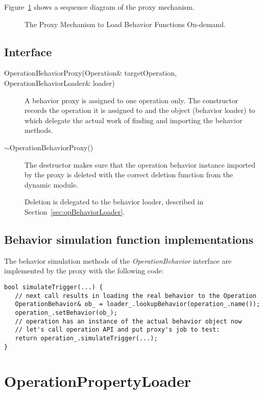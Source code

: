 \documentclass[a4paper,twoside]{tce}
\begin{document}
Figure~\ref{fig:proxySequence} shows a sequence diagram of the proxy
mechanism.

\begin{figure}[tb]
  \centerline{}
  \caption{The Proxy Mechanism to Load Behavior Functions On-demand.}
  \label{fig:proxySequence}
\end{figure}

\subsection{Interface}

\begin{description}
\item[OperationBehaviorProxy(Operation\& targetOperation, OperationBehaviorLoader\& loader)]%
  A behavior proxy is assigned to one operation only.  The constructor
  records the operation it is assigned to and the object (behavior loader)
  to which delegate the actual work of finding and importing the behavior
  methods.

\item[$\sim$OperationBehaviorProxy()]%
  The destructor makes sure that the operation behavior instance imported by
  the proxy is deleted with the correct deletion function from the dynamic
  module.

  Deletion is delegated to the behavior loader, described in
  Section~\ref{sec:opBehaviorLoader}.
\end{description}


\subsection{Behavior simulation function implementations}

The behavior simulation methods of the \emph{OperationBehavior} interface
are implemented by the proxy with the following code:

\begin{verbatim}
bool simulateTrigger(...) {
   // next call results in loading the real behavior to the Operation
   OperationBehavior& ob_ = loader_.lookupBehavior(operation_.name());
   operation_.setBehavior(ob_);
   // operation has an instance of the actual behavior object now
   // let's call operation API and put proxy's job to test:
   return operation_.simulateTrigger(...);
}
\end{verbatim}

\section{OperationPropertyLoader}
\label{sec:opPropertyLoader}
\end{document}
